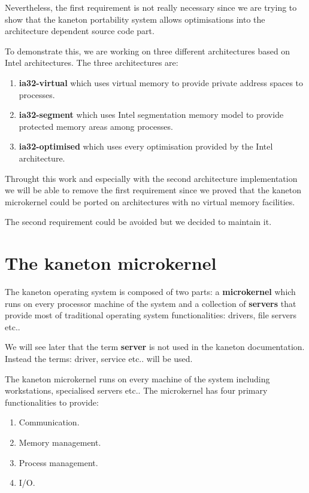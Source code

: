 \begin{multicols}{2}
Nevertheless, the first requirement is not really necessary since we are
trying to show that the kaneton portability system allows optimisations
into the architecture dependent source code part.

To demonstrate this, we are working on three different architectures based
on Intel architectures. The three architectures are:

\begin{enumerate}
  \item
    \textbf{ia32-virtual} which uses virtual memory to provide private
    address spaces to processes.
  \item
    \textbf{ia32-segment} which uses Intel segmentation memory model to
    provide protected memory areas among processes.
  \item
    \textbf{ia32-optimised} which uses every optimisation provided
    by the Intel architecture.
\end{enumerate}

Throught this work and especially with the second architecture implementation
we will be able to remove the first requirement since we proved that the
kaneton microkernel could be ported on architectures with no virtual memory
facilities.

The second requirement could be avoided but we decided to maintain it.

%
%

\section{The kaneton microkernel}

The kaneton operating system is composed of two parts: a \textbf{microkernel}
which runs on every processor machine of the system and a collection of
\textbf{servers} that provide most of traditional operating system
functionalities: drivers, file servers etc..

We will see later that the term \textbf{server} is not used in the kaneton
documentation. Instead the terms: driver, service etc.. will be used.

The kaneton microkernel runs on every machine of the system including
workstations, specialised servers etc.. The microkernel has four primary
functionalities to provide:

\begin{enumerate}
  \item
    Communication.
  \item
    Memory management.
  \item
    Process management.
  \item
    I/O.
\end{enumerate}


\end{multicols}
